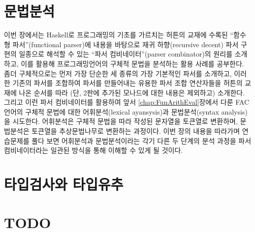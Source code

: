\chapter{문법분석}\label{chap:parser}
이번 장에서는 Haskell로 프로그래밍의 기초를 가르치는
허튼\cite{Hutton2016pih2nd}의 교재에 수록된
``함수형 파서''(functional parser)에 내용을 바탕으로
재귀 하향(recursive decent) 파서 구현의 일종으로 해석할 수 있는
``파서 컴비네이터''(parser combinator)의 원리를 소개하고,
이를 활용해 프로그래밍언어의 구체적 문법을 분석하는 활용 사례를 공부한다.
좀더 구체적으로는 먼저 가장 단순한 세 종류의 가장 기본적인 파서를 소개하고,
이러한 기존의 파서를 조합하여 파서를 만들어내는 유용한 파서 조합 연산자들을
허튼의 교재에 나온 순서를 따라 (단, 2판에 추가된 모나드에 대한
내용은 제외하고) 소개한다. 그리고 이런 파서 컴비네이터를 활용하여
앞서 \ref{chap:FunArithEval}장에서 다룬 FAC언어의 구체적 문법에 대한
어휘분석(lexical ayansysis)과 문법분석(syntax analysis)을 시도한다.
어휘분석은 구체적 문법을 따라 작성된 문자열을 토큰열로 변환하며,
문법분석은 토큰열을 추상문법나무로 변환하는 과정이다.
이번 장의 내용을 따라가며 연습문제를 풀다 보면
어휘분석과 문법분석이라는 각기 다른 두 단계의 분석 과정을
파서 컴비네이터라는 일관된 방식을 통해 이해할 수 있게 될 것이다.
\newpage


\chapter{타입검사와 타입유추}\label{chap:TyChkInf}


\newpage
\chapter{TODO}


